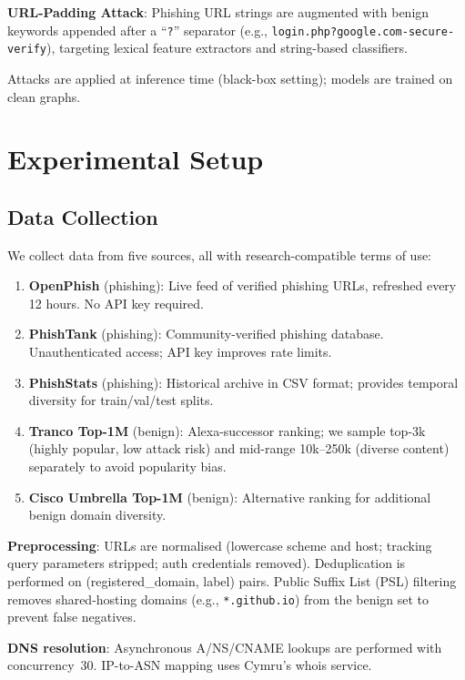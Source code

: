 \documentclass[conference]{IEEEtran}
\begin{document}
\textbf{URL-Padding Attack}: Phishing URL strings are augmented with benign
keywords appended after a ``\texttt{?}'' separator (e.g.,
\texttt{login.php?google.com-secure-verify}), targeting lexical feature
extractors and string-based classifiers.

Attacks are applied at inference time (black-box setting); models are trained
on clean graphs.

\section{Experimental Setup}
\label{sec:setup}

\subsection{Data Collection}
We collect data from five sources, all with research-compatible terms of use:

\begin{enumerate}
  \item \textbf{OpenPhish} (phishing): Live feed of verified phishing URLs,
  refreshed every 12 hours. No API key required.
  \item \textbf{PhishTank} (phishing): Community-verified phishing database.
  Unauthenticated access; API key improves rate limits.
  \item \textbf{PhishStats} (phishing): Historical archive in CSV format;
  provides temporal diversity for train/val/test splits.
  \item \textbf{Tranco Top-1M} (benign): Alexa-successor ranking; we sample
  top-3k (highly popular, low attack risk) and mid-range 10k--250k (diverse
  content) separately to avoid popularity bias.
  \item \textbf{Cisco Umbrella Top-1M} (benign): Alternative ranking for
  additional benign domain diversity.
\end{enumerate}

\textbf{Preprocessing}: URLs are normalised (lowercase scheme and host;
tracking query parameters stripped; auth credentials removed). Deduplication
is performed on (registered\_domain, label) pairs. Public Suffix List (PSL)
filtering removes shared-hosting domains (e.g., \texttt{*.github.io}) from
the benign set to prevent false negatives.

\textbf{DNS resolution}: Asynchronous A/NS/CNAME lookups are performed with
concurrency~30. IP-to-ASN mapping uses Cymru's whois service.
\end{document}
